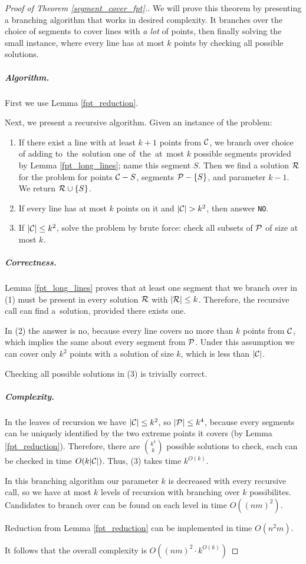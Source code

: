 \begin{proof}[Proof of Theorem \ref{segment_cover_fpt}.]\leavevmode

We will prove this theorem by presenting a branching algorithm that
works in desired complexity. It branches over the
choice of segments to cover lines with \textit{a lot} of points,
then finally solving the small instance, where
every line has at most $k$ points by checking all possible solutions.

\subparagraph{Algorithm.}
First we use Lemma \ref{fpt_reduction}.

Next, we present a recursive algorithm. Given an instance of the problem:

\begin{enumerate}[label={(\arabic*)}]
\item If there exist a line with at least $k+1$ points from $\mathcal{C}$,
we branch over choice of adding to~the~solution one of~the~at~most $k$ possible segments
provided by Lemma \ref{fpt_long_lines}; name this segment $S$.
Then we find a solution $\mathcal{R}$
for the problem for points $\mathcal{C} - S$, segments $\mathcal{P} - \{S\}$,
and parameter $k-1$. We return $\mathcal{R} \cup \{S\}$.
\item If every line has at most $k$ points on it and $|\mathcal{C}| > k^2$,
then answer \texttt{NO}.
\item If $|\mathcal{C}| \le k^2$, solve the problem by brute force:
check all subsets of $\mathcal{P}$ of size at most $k$.
\end{enumerate}

\subparagraph{Correctness.}

Lemma \ref{fpt_long_lines} proves that at least one segment that we
branch over in (1) must be present in every solution $\mathcal{R}$ with $|\mathcal{R}| \le k$.
Therefore, the recursive call can find a~solution, provided there exists one.

In (2) the answer is no, because every line covers no more than $k$ points
from $\mathcal{C}$, which implies the same about every segment from $\mathcal{P}$.
Under this assumption
we can cover only $k^2$ points with a solution of size $k$, which is less
than $|\mathcal{C}|$.

Checking all possible solutions in (3) is trivially correct.


\subparagraph{Complexity.}

In the leaves of recursion we have $|\mathcal{C}| \le k^2$, so $|\mathcal{P}| \le k^4$, because
every segments can be uniquely identified by the two extreme points it covers
(by Lemma \ref{fpt_reduction}). Therefore, there are $\binom{k^4}{k}$
possible solutions to check, each can be checked in time $O(k|\mathcal{C}|)$.
Thus, (3) takes time $k^{O(k)}$.


In this branching algorithm our parameter $k$ is decreased with every
recursive call, so we have at most $k$ levels of recursion with
branching over $k$ possibilites. Candidates to branch over
can be found on each level in time $O((nm)^2)$.

Reduction from Lemma \ref{fpt_reduction} can be implemented in time $O(n^2m)$.

It follows that the overall complexity is $O((nm)^2 \cdot k^{O(k)})$
\end{proof}

